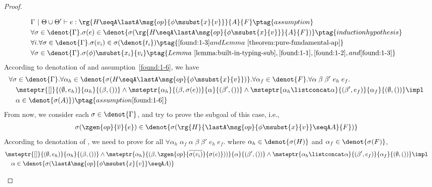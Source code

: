 \begin{proof}
\begin{enumerate}[label=Case]
{\begin{alignat}{2}
&\Gamma ~|~ \Theta \cup \Theta' \vdash e : \rg{H \seqA \lastA\msg{op}{\phi\msubst{x}{v}}}{A}{F} \ptag{assumption} \label{found:1-5} \\
&\forall \sigma \in \denot{\Gamma}. \sigma(e) \in \denot{\sigma(\rg{H \seqA \lastA\msg{op}{\phi\msubst{x}{v}}}{A}{F})} \ptag{induction hypothesis} \label{found:1-6} \\
&\forall i. \forall \sigma \in \denot{\Gamma}. \sigma(v_i) \in  \sigma(\denot{t_i}) \ptag{\ref{found:1-3} and Lemma~\ref{theorem:pure-fundamental-ap}} \label{found:1-7} \\
&\forall \sigma \in \denot{\Gamma}. \sigma(\phi)\msubst{x_i}{v_i} \ptag{Lemma~\ref{lemma:built-in-typing-sub}, \ref{found:1-1}, \ref{found:1-2}, and \ref{found:1-3}} \label{found:1-8}
\end{alignat}}\noindent
According to denotation of \PAT and assumption~\ref{found:1-6}, we have
{\footnotesize\begin{alignat}{2}
&\forall \sigma \in \denot{\Gamma}. \forall \alpha_h \in\denot{\sigma(H \seqA \lastA\msg{op}{\phi\msubst{x}{v}})}.\forall \alpha_f \in\denot{F}. \forall \alpha\;\beta\;\beta'\;e_h\;e_f. \notag 
\\&\quad \msteptr{[]}{(\emptyset, e_h)}{\alpha_h}{(\beta, ())} \land \msteptr{\alpha_h}{(\beta, \sigma(e))}{\alpha}{(\beta', ())} \land \msteptr{\alpha_h \listconcat \alpha }{(\beta', e_f)}{\alpha_f}{(\emptyset, ())} \impl \notag 
\\&\quad \alpha \in\denot{\sigma(A)}) \ptag{assumption \ref{found:1-6}} \label{found:1-9}
\end{alignat}}\noindent
From now, we consider each $\sigma \in \denot{\Gamma}$, and try to prove the subgoal of this case, i.e., 
{\footnotesize\begin{align*}
    \sigma(\zgen{op}{\overline{v}}{e}) \in \denot{\sigma(\rg{H}{\lastA\msg{op}{\phi\msubst{x}{v}} \seqA A}{F})}
\end{align*}}\noindent
According to denotation of \PAT, we need to prove for all $\forall \alpha_h\;\alpha_f\;\alpha\;\beta\;\beta'\;e_h\;e_f.$ where $\alpha_h \in \denot{\sigma(H)}$ and $\alpha_f \in \denot{\sigma(F)}$, 
{\footnotesize\begin{align*}
&\msteptr{[]}{(\emptyset, e_h)}{\alpha_h}{(\beta, ())} \land \msteptr{\alpha_h}{(\beta, \zgen{op}{\overline{\sigma(v_i)}}{\sigma(e)}))}{\alpha}{(\beta', ())} \land \msteptr{\alpha_h \listconcat \alpha }{(\beta', e_f)}{\alpha_f}{(\emptyset, ())} \impl \notag 
\\&\quad \alpha \in\denot{\sigma(\lastA\msg{op}{\phi\msubst{x}{v}} \seqA A)}

\end{align*}}
\end{enumerate}
\end{proof}
